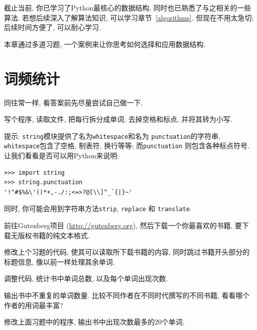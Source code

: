 \documentclass[10pt]{book}
\begin{document}
截止当前, 你已学习了Python最核心的数据结构, 
同时也已熟悉了与之相关的一些算法. 
若想后续深入了解算法知识, 可以学习章节~\ref{algorithms}. 
但现在不用太急切; 后续时间方便了, 可以耐心学习. 

本章通过多道习题, 一个案例来让你思考如何选择和应用数据结构. 


\section{词频统计}
\label{analysis}

同往常一样, 看答案前先尽量尝试自己做一下. 

\begin{exercise}

写个程序, 读取文件, 把每行拆分成单词, 去掉空格和标点, 并将其转为小写. 

提示: {\tt string}模块提供了名为{\tt whitespace}和名为 
{\tt  punctuation}的字符串, {\tt whitespace}包含了空格, 制表符, 换行等等; 而{\tt punctuation} 则包含各种标点符号. 
让我们看看是否可以用Python来说明:

\begin{verbatim}
>>> import string
>>> string.punctuation
'!"#$%&\'()*+,-./:;<=>?@[\\]^_`{|}~'
\end{verbatim}
%
同时, 你可能会用到字符串方法{\tt strip},
{\tt replace} 和 {\tt translate}.

\end{exercise}


\begin{exercise}

前往Gutenberg项目 (\url{http://gutenberg.org}), 然后下载一个你最喜欢的书籍, 
要下载无版权书籍的纯文本格式. 

修改上个习题的代码, 使其可以读取所下载书籍的内容, 同时跳过书籍开头部分的标题信息, 像以前一样处理其余单词. 

调整代码, 统计书中单词总数, 以及每个单词出现次数. 

输出书中不重复的单词数量. 
比较不同作者在不同时代撰写的不同书籍, 看看哪个作者的用词最丰富?
\end{exercise}


\begin{exercise}

修改上面习题中的程序, 输出书中出现次数最多的20个单词. 

\end{exercise}
\end{document}
